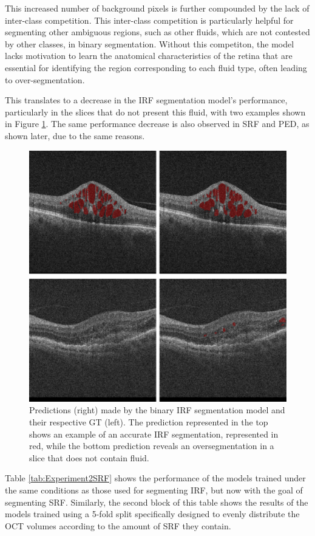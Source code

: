 \par
This increased number of background pixels is further compounded by the lack of inter-class competition. This inter-class competition is particularly helpful for segmenting other ambiguous regions, such as other fluids, which are not contested by other classes, in binary segmentation. Without this competiton, the model lacks motivation to learn the anatomical characteristics of the retina that are essential for identifying the region corresponding to each fluid type, often leading to over-segmentation. 
\par
This translates to a decrease in the IRF segmentation model's performance, particularly in the slices that do not present this fluid, with two examples shown in Figure \ref{fig:Experiment2IRFSegmentation}. The same performance decrease is also observed in SRF and PED, as shown later, due to the same reasons.
\begin{figure}[!ht]
	\centering
	\includegraphics[width=0.7\linewidth]{figures/Experiment2IRFSegmentation.png}
	\caption{Predictions (right) made by the binary IRF segmentation model and their respective GT (left). The prediction represented in the top shows an example of an accurate IRF segmentation, represented in red, while the bottom prediction reveals an oversegmentation in a slice that does not contain fluid.}
	\label{fig:Experiment2IRFSegmentation}
\end{figure}

Table \ref{tab:Experiment2SRF} shows the performance of the models trained under the same conditions as those used for segmenting IRF, but now with the goal of segmenting SRF. Similarly, the second block of this table shows the results of the models trained using a 5-fold split specifically designed to evenly distribute the OCT volumes according to the amount of SRF they contain.

